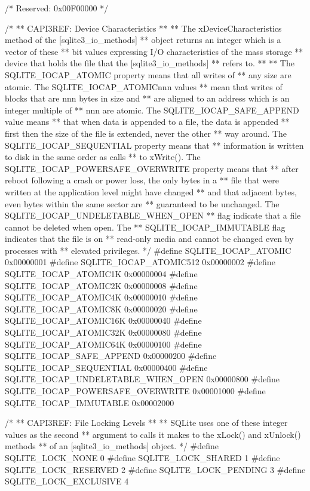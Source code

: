 \begin{Codex}[label=sqlite3.h,numbers=left]
{/* Reserved:                         0x00F00000 */

/*
** CAPI3REF: Device Characteristics
**
** The xDeviceCharacteristics method of the [sqlite3_io_methods]
** object returns an integer which is a vector of these
** bit values expressing I/O characteristics of the mass storage
** device that holds the file that the [sqlite3_io_methods]
** refers to.
**
** The SQLITE_IOCAP_ATOMIC property means that all writes of
** any size are atomic.  The SQLITE_IOCAP_ATOMICnnn values
** mean that writes of blocks that are nnn bytes in size and
** are aligned to an address which is an integer multiple of
** nnn are atomic.  The SQLITE_IOCAP_SAFE_APPEND value means
** that when data is appended to a file, the data is appended
** first then the size of the file is extended, never the other
** way around.  The SQLITE_IOCAP_SEQUENTIAL property means that
** information is written to disk in the same order as calls
** to xWrite().  The SQLITE_IOCAP_POWERSAFE_OVERWRITE property means that
** after reboot following a crash or power loss, the only bytes in a
** file that were written at the application level might have changed
** and that adjacent bytes, even bytes within the same sector are
** guaranteed to be unchanged.  The SQLITE_IOCAP_UNDELETABLE_WHEN_OPEN
** flag indicate that a file cannot be deleted when open.  The
** SQLITE_IOCAP_IMMUTABLE flag indicates that the file is on
** read-only media and cannot be changed even by processes with
** elevated privileges.
*/
#define SQLITE_IOCAP_ATOMIC                 0x00000001
#define SQLITE_IOCAP_ATOMIC512              0x00000002
#define SQLITE_IOCAP_ATOMIC1K               0x00000004
#define SQLITE_IOCAP_ATOMIC2K               0x00000008
#define SQLITE_IOCAP_ATOMIC4K               0x00000010
#define SQLITE_IOCAP_ATOMIC8K               0x00000020
#define SQLITE_IOCAP_ATOMIC16K              0x00000040
#define SQLITE_IOCAP_ATOMIC32K              0x00000080
#define SQLITE_IOCAP_ATOMIC64K              0x00000100
#define SQLITE_IOCAP_SAFE_APPEND            0x00000200
#define SQLITE_IOCAP_SEQUENTIAL             0x00000400
#define SQLITE_IOCAP_UNDELETABLE_WHEN_OPEN  0x00000800
#define SQLITE_IOCAP_POWERSAFE_OVERWRITE    0x00001000
#define SQLITE_IOCAP_IMMUTABLE              0x00002000

/*
** CAPI3REF: File Locking Levels
**
** SQLite uses one of these integer values as the second
** argument to calls it makes to the xLock() and xUnlock() methods
** of an [sqlite3_io_methods] object.
*/
#define SQLITE_LOCK_NONE          0
#define SQLITE_LOCK_SHARED        1
#define SQLITE_LOCK_RESERVED      2
#define SQLITE_LOCK_PENDING       3
#define SQLITE_LOCK_EXCLUSIVE     4

}
\end{Codex}
